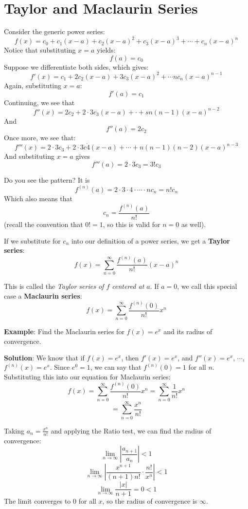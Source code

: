 \chapter{Taylor and Maclaurin Series}

Consider the generic power series:
$$f(x) = c_0 + c_1(x - a) + c_2(x - a)^2 + c_3(x - a)^3 + \cdots + c_n(x - a)^n$$
Notice that substituting $x = a$ yields:
$$f(a) = c_0$$
Suppose we differentiate both sides, which gives:
$$f'(x) = c_1 + 2c_2(x - a) + 3c_3(x - a)^2 + \cdots nc_n(x-a)^{n-1}$$
Again, substituting $x = a$:
$$f'(a) = c_1$$
Continuing, we see that
$$f''(x) = 2c_2 + 2 \cdot 3c_3(x-a) + \cdot + sn(n-1)(x-a)^{n-2}$$
And
$$f''(a) = 2c_2$$
Once more, we see that:
$$f'''(x) = 2 \cdot 3 c_3 + 2 \cdot 3 c\dot 4 (x-a) + \cdots + n (n-1)(n-2)(x-a)^{n-3}$$
And substituting $x = a$ gives
$$f'''(a) = 2 \cdot 3 c_3 = 3!c_3$$

Do you see the pattern? It is 
$$f^{(n)}(a) = 2 \cdot 3 \cdot 4 \cdot \cdots \cdot nc_n = n!c_n$$
Which also means that 
$$c_n = \frac{f^{(n)}(a)}{n!}$$
(recall the convention that $0! = 1$, so this is valid for $n = 0$ as well). 

If we substitute for $c_n$ into our definition of a power series, we get a 
\textbf{Taylor series}:
$$f(x) = \sum_{n=0}^\infty \frac{f^{(n)}(a)}{n!} \left( x - a \right)^n$$

This is called the \textit{Taylor series of $f$ centered at $a$}. If $a = 0$, 
we call this special case a \textbf{Maclaurin series}:
$$f(x) = \sum_{n=0}^\infty \frac{f^{(n)}(0)}{n!}x^n$$

\textbf{Example}: Find the Maclaurin series for $f(x) = e^x$ and its radius of 
convergence.

\textbf{Solution}: We know that if $f(x) = e^x$, then $f'(x) = e^x$, and 
$f''(x) = e^x$, $\cdots$, $f^{(n)}(x) = e^x$. Since $e^0 = 1$, we can say that 
$f^{(n)}(0) = 1$ for all $n$. Substituting this into our equation for 
Maclaurin series:
$$f(x) = \sum_{n=0}^\infty \frac{f^{(n)}(0)}{n!}x^n = \sum_{n=0}^\infty 
\frac{1}{n!}x^n $$
$$= \sum_{n=0}^\infty \frac{x^n}{n!}$$

Taking $a_n = \frac{x^n}{n!}$ and applying the Ratio test, we can find the 
radius of convergence:
$$\lim_{n \to \infty} \left| \frac{a_{n + 1}}{a_n} \right| < 1$$
$$\lim_{n \to \infty} \left| \frac{x^{n + 1}}{(n+1)n!} \cdot \frac{n!}{x^n} 
\right| < 1$$
$$\lim_{n \to \infty} \frac{|x|}{n + 1} = 0 < 1$$
The limit converges to 0 for all $x$, so the radius of convergence is $\infty$.


